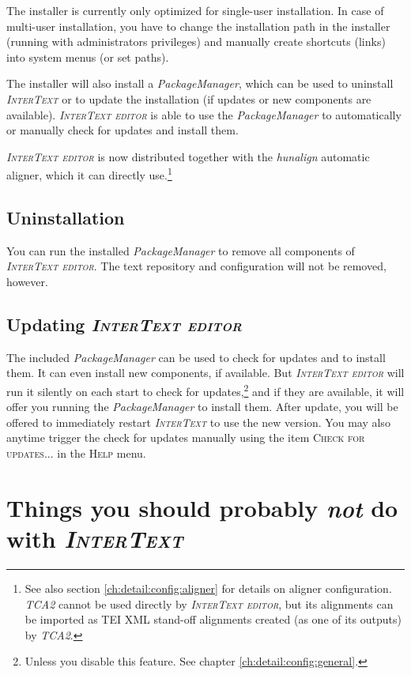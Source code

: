 \documentclass[a4paper,10pt,oneside]{book}
\newcommand{\IT}{\textit{\textsc{InterText}}\xspace}
\newcommand{\ITeditor}{\textit{\textsc{InterText editor}}\xspace}
\newcommand{\menu}[1]{\textsc{#1}}
\begin{document}
The installer is currently only optimized for single-user installation. In case of multi-user installation, you have to change the installation path in the installer (running with administrators privileges) and manually create shortcuts (links) into system menus (or set paths).

The installer will also install a \emph{PackageManager}, which can be used to uninstall \IT or to update the installation (if updates or new components are available). \ITeditor is able to use the \emph{PackageManager} to automatically or manually check for updates and install them.

\ITeditor is now distributed together with the \emph{hunalign} automatic aligner, which it can directly use.\footnote{See also section \ref{ch:detail:config:aligner} for details on aligner configuration. \emph{TCA2} cannot be used directly by \ITeditor, but its alignments can be imported as TEI XML stand-off alignments created (as one of its outputs) by \emph{TCA2}.} 

\section{Uninstallation}

You can run the installed \emph{PackageManager} to remove all components of \ITeditor. The text repository and configuration will not be removed, however.

\section{Updating \ITeditor}

The included \emph{PackageManager} can be used to check for updates and to install them. It can even install new components, if available. But \ITeditor will run it silently on each start to check for updates,\footnote{Unless you disable this feature. See chapter \ref{ch:detail:config:general}.} and if they are available, it will offer you running the \emph{PackageManager} to install them. After update, you will be offered to immediately restart \IT to use the new version. You may also anytime trigger the check for updates manually using the item \menu{Check for updates...} in the \menu{Help} menu.


\chapter{Things you should probably \emph{not} do with \IT}\label{ch:intro:donts}
\end{document}
